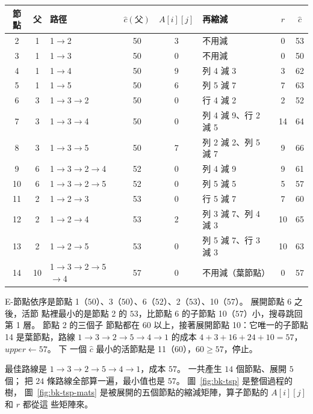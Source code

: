 \begin{center}
\small
\begin{tabular}{cclcclcc}
\toprule
節點 & 父 & 路徑 & $\hat c(\text{父})$ & $A[i][j]$ & 再縮減 & $r$ & $\hat c$ \\
\midrule
2 & 1 & 1$\to$2 & 50 & 3 & 不用減 & 0 & 53 \\
3 & 1 & 1$\to$3 & 50 & 0 & 不用減 & 0 & 50 \\
4 & 1 & 1$\to$4 & 50 & 9 & 列 4 減 3 & 3 & 62 \\
5 & 1 & 1$\to$5 & 50 & 6 & 列 5 減 7 & 7 & 63 \\
\midrule
6 & 3 & 1$\to$3$\to$2 & 50 & 0 & 行 4 減 2 & 2 & 52 \\
7 & 3 & 1$\to$3$\to$4 & 50 & 0 & 列 4 減 9、行 2 減 5 & 14 & 64 \\
8 & 3 & 1$\to$3$\to$5 & 50 & 7 & 列 2 減 2、列 5 減 7 & 9 & 66 \\
\midrule
9 & 6 & 1$\to$3$\to$2$\to$4 & 52 & 0 & 列 4 減 9 & 9 & 61 \\
10 & 6 & 1$\to$3$\to$2$\to$5 & 52 & 0 & 列 5 減 5 & 5 & 57 \\
\midrule
11 & 2 & 1$\to$2$\to$3 & 53 & 0 & 行 5 減 7 & 7 & 60 \\
12 & 2 & 1$\to$2$\to$4 & 53 & 2 & 列 3 減 7、列 4 減 3 & 10 & 65 \\
13 & 2 & 1$\to$2$\to$5 & 53 & 0 & 列 5 減 7、行 3 減 3 & 10 & 63 \\
\midrule
14 & 10 & 1$\to$3$\to$2$\to$5$\to$4 & 57 & 0 & 不用減（葉節點） & 0 & 57 \\
\bottomrule
\end{tabular}
\end{center}

E-節點依序是節點 1（$50$）、3（$50$）、6（$52$）、2（$53$）、10（$57$）。 展開節點 6 之後，活節
點裡最小的是節點 2 的 $53$，比節點 6 的子節點 10（$57$）小，搜尋跳回第 1 層。 節點 2 的三個子
節點都在 $60$ 以上，接著展開節點 10：它唯一的子節點 14 是葉節點，路線
$1 \to 3 \to 2 \to 5 \to 4 \to 1$ 的成本 $4 + 3 + 16 + 24 + 10 = 57$，$\mathit{upper} \gets 57$。 下
一個 $\hat c$ 最小的活節點是 11（$60$），$60 \ge 57$，停止。

最佳路線是 $1 \to 3 \to 2 \to 5 \to 4 \to 1$，成本 $57$。 一共產生 $14$ 個節點、展開 $5$ 個；
把 $24$ 條路線全部算一遍，最小值也是 $57$。 圖~\ref{fig:bk-tsp} 是整個過程的樹，
圖~\ref{fig:bk-tsp-mats} 是被展開的五個節點的縮減矩陣，算子節點的 $A[i][j]$ 和 $r$ 都從這
些矩陣來。

